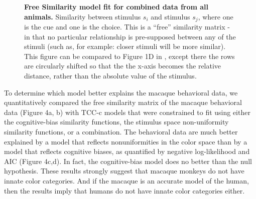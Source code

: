 \begin{figure}
    \centering
    \begin{subfigure}[b]{0.3\textwidth}
         \centering
         \caption{}
         
    \end{subfigure}
    \hfill
    \begin{subfigure}[b]{0.3\textwidth}
         \centering
         \caption{}
         
    \end{subfigure}
    \hfill
       \begin{subfigure}[b]{0.3\textwidth}
         \centering
         \caption{}
         
    \end{subfigure}
    \caption{\textbf{Free Similarity model fit for combined data from all animals.}
    Similarity between stimulus $s_i$ and stimulus $s_j$, where one is the cue and one is the choice. This is a ``free'' similarity matrix - in that no particular relationship is pre-supposed between any of the stimuli (such as, for example: closer stimuli will be more similar). This figure can be compared to Figure 1D in \cite{schurgin_psychophysical_2020}, except there the rows are circularly shifted so that the the x-axis becomes the relative distance, rather than the absolute value of the stimulus. %
    } 
    \label{fig:TCCOutput}
\end{figure}


To determine which model better explains the macaque behavioral data, we quantitatively compared the free similarity matrix of the macaque behavioral data (Figure 4a, b) with TCC-c models that were constrained to fit using either the cognitive-bias similarity functions, the stimulus space non-uniformity similarity functions, or a combination.  The behavioral data are much better explained by a model that reflects nonuniformities in the color space than by a model that reflects cognitive biases, as quantified by negative log-likelihood and AIC (Figure 4c,d). In fact, the cognitive-bias model does no better than the null hypothesis. These results strongly suggest that macaque monkeys do not have innate color categories. And if the macaque is an accurate model of the human, then the results imply that humans do not have innate color categories either. 


